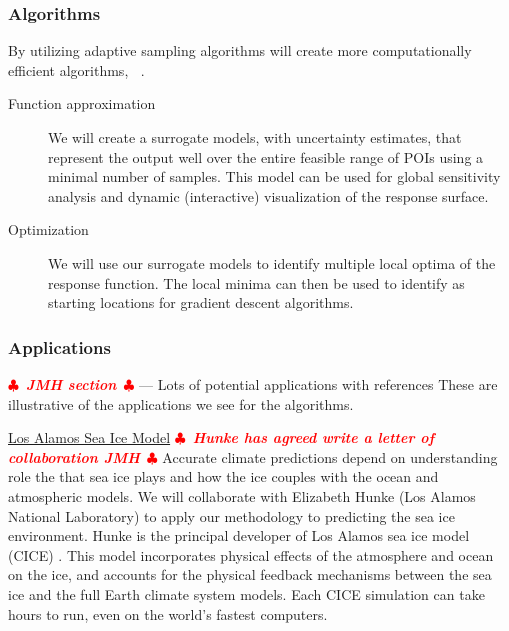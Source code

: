 \documentclass[11pt]{NSFamsart}
\DeclareMathOperator{\QOI}{QOI}
\DeclareMathOperator{\APP}{\widehat{\QOI}}
\newif\ifnotesw \noteswtrue
\newcommand{\notes}[1]{\ifnotesw \textcolor{red}{  $\clubsuit$\ {\sf \bf \it  #1}\ $\clubsuit$  }\fi}
\begin{document}
\subsubsection{Algorithms}
By utilizing adaptive sampling algorithms will create more computationally efficient algorithms, $\APP$.
\renewcommand{\descriptionlabel}[1]{\hspace{\labelsep}\textit{#1}.}
\begin{description}
\item[Function approximation] We will create a surrogate models, with uncertainty estimates, that represent the output well over the entire feasible range of POIs using a minimal number of samples.  This model can be used for global sensitivity analysis and dynamic (interactive) visualization of the response surface. 
\item[Optimization] We will use our surrogate models to identify multiple local optima of the response function.  The local minima can then be used to identify as starting locations for gradient descent algorithms.
\end{description}

\subsubsection{Applications} \notes{JMH section}
--- Lots of potential applications with references 
These are illustrative of the applications we see for the algorithms. 


\underline{Los Alamos Sea Ice Model}  \notes{Hunke has agreed write a letter of collaboration JMH}
Accurate climate predictions depend on understanding role the that sea ice plays and how the ice couples with the ocean and atmospheric models.
We will collaborate with Elizabeth Hunke (Los Alamos National Laboratory) to apply our methodology to predicting the sea ice environment.   Hunke is the principal developer of  Los Alamos sea ice model (CICE) \cite{hunke2017cice, hunke2010cice}. This model incorporates physical effects of the atmosphere and ocean on the ice, and accounts for the physical feedback mechanisms between the sea ice and the full Earth climate system models. Each CICE simulation can take hours to run, even on the world's fastest computers.
\end{document}
